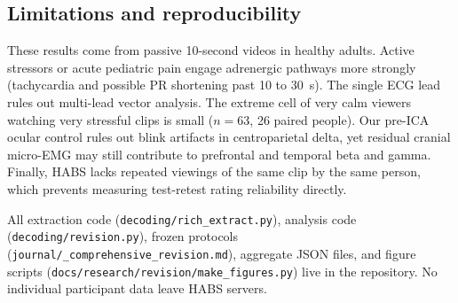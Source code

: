 \documentclass[10pt]{article}
\begin{document}
\subsection{Limitations and reproducibility}

These results come from passive 10-second videos in healthy adults. Active stressors or acute pediatric pain engage adrenergic pathways more strongly (tachycardia and possible PR shortening past 10 to 30~s). The single ECG lead rules out multi-lead vector analysis. The extreme cell of very calm viewers watching very stressful clips is small ($n = 63$, 26 paired people). Our pre-ICA ocular control rules out blink artifacts in centroparietal delta, yet residual cranial micro-EMG may still contribute to prefrontal and temporal beta and gamma. Finally, HABS lacks repeated viewings of the same clip by the same person, which prevents measuring test-retest rating reliability directly.

All extraction code (\texttt{decoding/\allowbreak rich\_extract.py}), analysis code (\texttt{decoding/\allowbreak revision.py}), frozen protocols (\texttt{journal/\_comprehensive\_revision.md}), aggregate JSON files, and figure scripts (\texttt{docs/\allowbreak research/\allowbreak revision/\allowbreak make\_figures.py}) live in the repository. No individual participant data leave HABS servers.
\end{document}
